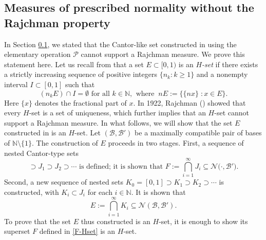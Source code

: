 \documentclass[12pt, twoside]{article}
\theoremstyle{definition}
\numberwithin{equation}{section}
\begin{document}
\subsection{Measures of prescribed normality without the Rajchman property} \label{Pollington-not-Rajchman-section}
In Section \ref{Pollington-not-Rajchman-section}, we stated that the Cantor-like set constructed in \cite{p81} using the elementary operation $\mathscr{P}$ cannot support a Rajchman measure. We prove this statement here. 
\vskip0.1in 
\noindent Let us recall from \cite[p.\,38]{KL-book} that a set $E \subset [0,1)$ is an {\em{$H$-set}} if there exists a strictly increasing sequence of positive integers $\{ n_k : k \geq 1 \}$ and a nonempty interval $I \subset [0,1]$ such that 
\begin{equation}  \label{Hset-def} 
(n_k E) \cap I = \emptyset \text{ for all $k \in \mathbb{N}$,} \; \; \text{where} \; \;  nE  := \big\{\{nx\}\; : x \in E \big\}. 
\end{equation} 
Here $\{x\}$ denotes the fractional part of $x$. In 1922, Rajchman (\cite[p.\,39]{KL-book}) showed that every $H$-set is a set of uniqueness, which further implies that an $H$-set cannot support a Rajchman measure. In what follows, we will show that the set $E$ constructed in \cite{p81} is an $H$-set. 
\vskip0.1in
\noindent  Let $(\mathscr{B}, \mathscr{B}')$ be a maximally compatible pair of bases of $\mathbb{N} \setminus \{1\}$.
The construction of $E$ proceeds in two stages.  First, a sequence of nested Cantor-type sets 
\begin{equation} [0,1]\supset J_1 \supset J_2 \supset \cdots  \text{ is defined; it is shown that }  
F := \bigcap_{i=1}^{\infty} J_i \subseteq \mathscr{N}\bigl( \cdot, \mathscr{B}' \bigr). \label{F-Hset} 
\end{equation}
Second, a new sequence of nested sets $K_0=[0,1] \supset K_1 \supset K_2 \supset \cdots$ is constructed, with $K_i \subset J_i$ for each $i\in\mathbb{N}$.
It is shown that 
\[ E := \bigcap_{i=1}^{\infty} K_i \subseteq \mathscr{N}(\mathscr{B}, \mathscr{B}'). \] 
To prove that the set $E$ thus constructed is an $H$-set, it is enough to show its superset $F$ defined in \eqref{F-Hset} is an $H$-set. 
\end{document}
